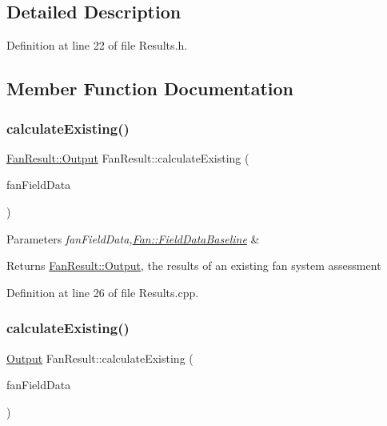 \subsection{Detailed Description}


Definition at line 22 of file Results.\+h.



\subsection{Member Function Documentation}
\mbox{\label{class_fan_result_ad9bd0cc8f62fcb7bb7aca7eea511a2f3}} 
\subsubsection{\texorpdfstring{calculate\+Existing()}{calculateExisting()}\hspace{0.1cm}{\footnotesize\ttfamily [1/3]}}
{\footnotesize\ttfamily \hyperlink{struct_fan_result_1_1_output}{Fan\+Result\+::\+Output} Fan\+Result\+::calculate\+Existing (\begin{DoxyParamCaption}\item[{\hyperlink{struct_fan_1_1_field_data_baseline}{Fan\+::\+Field\+Data\+Baseline} const \&}]{fan\+Field\+Data }\end{DoxyParamCaption})}


\begin{DoxyParams}{Parameters}
{\em fan\+Field\+Data,\hyperlink{struct_fan_1_1_field_data_baseline}{Fan\+::\+Field\+Data\+Baseline}} & \\
\hline
\end{DoxyParams}
\begin{DoxyReturn}{Returns}
\hyperlink{struct_fan_result_1_1_output}{Fan\+Result\+::\+Output}, the results of an existing fan system assessment 
\end{DoxyReturn}


Definition at line 26 of file Results.\+cpp.

\mbox{\label{class_fan_result_abc80cb0fb339969c2497786e479d9484}} 
\subsubsection{\texorpdfstring{calculate\+Existing()}{calculateExisting()}\hspace{0.1cm}{\footnotesize\ttfamily [2/3]}}
{\footnotesize\ttfamily \hyperlink{struct_fan_result_1_1_output}{Output} Fan\+Result\+::calculate\+Existing (\begin{DoxyParamCaption}\item[{\hyperlink{struct_fan_1_1_field_data_baseline}{Fan\+::\+Field\+Data\+Baseline} const \&}]{fan\+Field\+Data }\end{DoxyParamCaption})}


